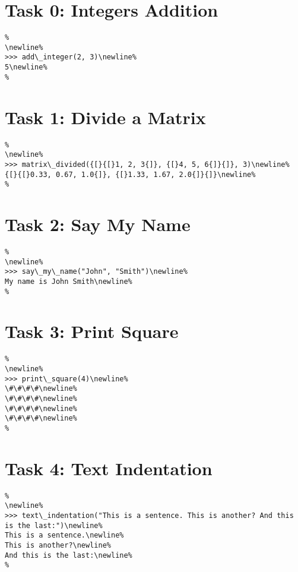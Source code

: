\documentclass{article}%
\begin{document}
%
\normalsize%
\section*{Task 0: Integers Addition}%
\label{sec:Task0IntegersAddition}%
\begin{verbatim}%
\newline%
>>> add\_integer(2, 3)\newline%
5\newline%
%
\end{verbatim}

%
\section*{Task 1: Divide a Matrix}%
\label{sec:Task1DivideaMatrix}%
\begin{verbatim}%
\newline%
>>> matrix\_divided({[}{[}1, 2, 3{]}, {[}4, 5, 6{]}{]}, 3)\newline%
{[}{[}0.33, 0.67, 1.0{]}, {[}1.33, 1.67, 2.0{]}{]}\newline%
%
\end{verbatim}

%
\section*{Task 2: Say My Name}%
\label{sec:Task2SayMyName}%
\begin{verbatim}%
\newline%
>>> say\_my\_name("John", "Smith")\newline%
My name is John Smith\newline%
%
\end{verbatim}

%
\section*{Task 3: Print Square}%
\label{sec:Task3PrintSquare}%
\begin{verbatim}%
\newline%
>>> print\_square(4)\newline%
\#\#\#\#\newline%
\#\#\#\#\newline%
\#\#\#\#\newline%
\#\#\#\#\newline%
%
\end{verbatim}

%
\section*{Task 4: Text Indentation}%
\label{sec:Task4TextIndentation}%
\begin{verbatim}%
\newline%
>>> text\_indentation("This is a sentence. This is another? And this is the last:")\newline%
This is a sentence.\newline%
This is another?\newline%
And this is the last:\newline%
%
\end{verbatim}
\end{document}
